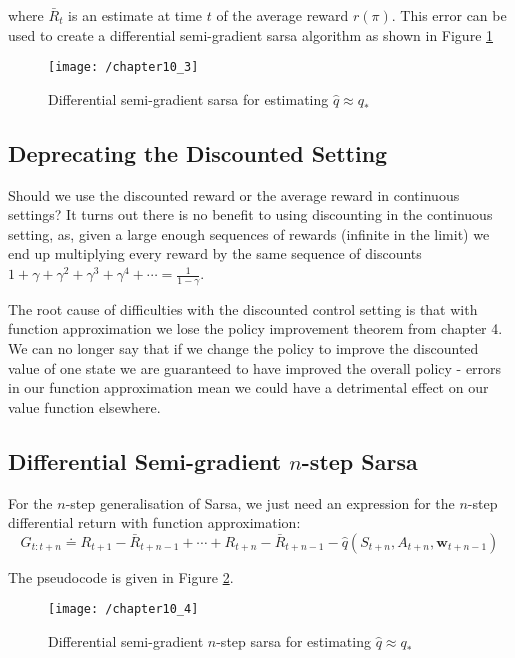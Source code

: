 where $\bar{R}_t$ is an estimate at time $t$ of the average reward $r(\pi)$. This error can be used to create a differential semi-gradient sarsa algorithm as shown in Figure \ref{fig: 10_3}
\begin{figure}[h!]
	\centering
	\texttt{[image: /chapter10\_3]}
	\caption{Differential semi-gradient sarsa for estimating $\hat{q} \approx q_*$}
	\label{fig: 10_3}
\end{figure}

\subsection{Deprecating the Discounted Setting}
Should we use the discounted reward or the average reward in continuous settings? It turns out there is no benefit to using discounting in the continuous setting, as, given a large enough sequences of rewards (infinite in the limit) we end up multiplying every reward by the same sequence of discounts $1 + \gamma + \gamma^2 + \gamma^3 + \gamma^4 + \cdots = \frac{1}{1 - \gamma}$.

The root cause of difficulties with the discounted control setting is that with function approximation we lose the policy improvement theorem from chapter 4. We can no longer say that if we change the policy to improve the discounted value of one state we are guaranteed to have improved the overall policy - errors in our function approximation mean we could have a detrimental effect on our value function elsewhere.

\subsection{Differential Semi-gradient $n$-step Sarsa}
For the $n$-step generalisation of Sarsa, we just need an expression for the $n$-step differential return with function approximation:
\begin{equation}
G_{t:t+n} \doteq R_{t+1} - \bar{R}_{t+n-1} + \cdots + R_{t+n} - \bar{R}_{t+n-1} - \hat{q}(S_{t+n}, A_{t+n}, \textbf{w}_{t+n-1}) 
\end{equation}

The pseudocode is given in Figure \ref{fig: 10_4}.

\begin{figure}[h!]
	\centering
	\texttt{[image: /chapter10\_4]}
	\caption{Differential semi-gradient $n$-step sarsa for estimating $\hat{q} \approx q_*$}
	\label{fig: 10_4}
\end{figure}

